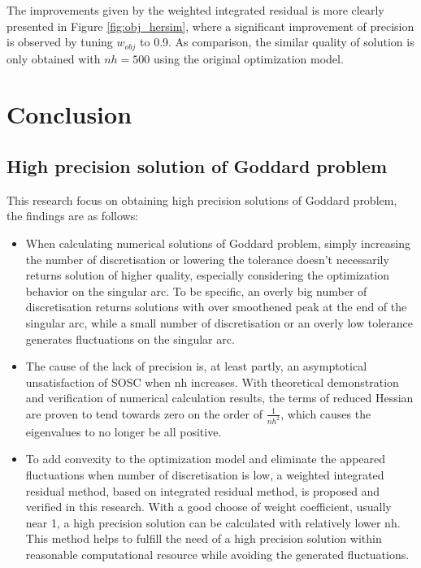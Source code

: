 \documentclass{article}
\begin{document}
The improvements given by the weighted integrated residual is more clearly presented in Figure \ref{fig:obj_hersim}, where a significant improvement of precision is observed by tuning $w_{obj}$ to 0.9. As comparison, the similar quality of solution is only obtained with $nh=500$ using the original optimization model.
\clearpage

\section{Conclusion}
\subsection{High precision solution of Goddard problem}
This research focus on obtaining high precision solutions of Goddard problem, the findings are as follows:
\begin{itemize}
    \item When calculating numerical solutions of Goddard problem, simply increasing the number of discretisation or lowering the tolerance doesn't necessarily returns solution of higher quality, especially considering the optimization behavior on the singular arc. To be specific, an overly big number of discretisation returns solutions with over smoothened peak at the end of the singular arc, while a small number of discretisation or an overly low tolerance generates fluctuations on the singular arc. 
    \item The cause of the lack of precision is, at least partly, an asymptotical unsatisfaction of SOSC when nh increases. With theoretical demonstration and verification of numerical calculation results, the terms of reduced Hessian are proven to tend towards zero on the order of $\frac{1}{nh^2}$, which causes the eigenvalues to no longer be all positive.
    \item To add convexity to the optimization model and eliminate the appeared fluctuations when number of discretisation is low, a weighted integrated residual method, based on integrated residual method, is proposed and verified in this research. With a good choose of weight coefficient, usually near 1, a high precision solution can be calculated with relatively lower nh. This method helps to fulfill the need of a high precision solution within reasonable computational resource while avoiding the generated fluctuations.
\end{itemize}
\end{document}
